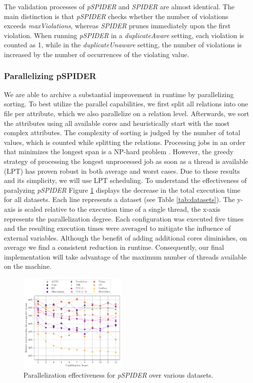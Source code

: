 The validation processes of \textit{pSPIDER} and \textit{SPIDER} are almost identical. The main distinction is that \textit{pSPIDER} checks whether the number of violations exceeds \textit{maxViolations}, whereas \textit{SPIDER} prunes immediately upon the first violation. When running \textit{pSPIDER} in a \textit{duplicateAware} setting, each violation is counted as 1, while in the \textit{duplicateUnaware} setting, the number of violations is increased by the number of occurrences of the violating value.

\subsubsection{\textbf{Parallelizing pSPIDER}}
We are able to archive a substantial improvement in runtime by parallelizing sorting. To best utilize the parallel capabilities, we first split all relations into one file per attribute, which we also parallelize on a relation level. Afterwards, we sort the attributes using all available cores and heuristically start with the most complex attributes. The complexity of sorting is judged by the number of total values, which is counted while splitting the relations. Processing jobs in an order that minimizes the longest span is a NP-hard problem \cite{graham1979optimization}. However, the greedy strategy of processing the longest unprocessed job as soon as a thread is available (LPT) has proven robust in both average and worst cases. Due to these results and its simplicity, we will use LPT scheduling. To understand the effectiveness of paralyzing \textit{pSPIDER} Figure \ref{fig:parallel_spider} displays the decrease in the total execution time for all datasets. Each line represents a dataset (see Table \ref{tab:datasets}). The y-axis is scaled relative to the execution time of a single thread, the x-axis represents the parallelization degree. Each configuration was executed five times and the resulting execution times were averaged to mitigate the influence of external variables. Although the benefit of adding additional cores diminishes, on average we find a consistent reduction in runtime. Consequently, our final implementation will take advantage of the maximum number of threads available on the machine.

\begin{figure}
    \centering
    \includegraphics[width=0.475\textwidth]{figures/spider_parallel.pdf}
    \caption{Parallelization effectiveness for \textit{pSPIDER} over various datasets.}
    \label{fig:parallel_spider}
\end{figure}